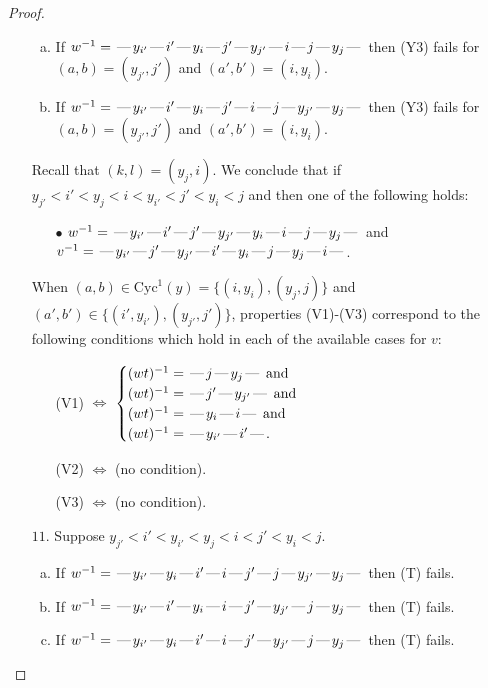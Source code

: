 \documentclass[10pt]{article}
\theoremstyle{definition}
\theoremstyle{definition}
\def\dash{\text{\hspace{0.5mm}---\hspace{0.5mm}}}
\def\Cyc{\mathrm{Cyc}}
\begin{document}
\begin{proof}
\begin{enumerate}
\begin{enumerate}[(a)]
\item If $w^{-1} = \dash y_{i'}\dash i'\dash y_i\dash j'\dash y_{j'}\dash i\dash j\dash y_j\dash $ then (Y3) fails for $(a,b)=(y_{j'},j')$ and $(a',b')=(i,y_i)$.
\item If $w^{-1} = \dash y_{i'}\dash i'\dash y_i\dash j'\dash i\dash j\dash y_{j'}\dash y_j\dash $ then (Y3) fails for $(a,b)=(y_{j'},j')$ and $(a',b')=(i,y_i)$.
\end{enumerate}
Recall that $(k,l) = (y_j,i)$.
We conclude that if $y_{j'} < i' < y_j < i < y_{i'} < j' < y_i < j$ and then one of the following holds:
\begin{enumerate}
\item[$\bullet$] $w^{-1} = \dash y_{i'}\dash i'\dash j'\dash y_{j'}\dash y_i\dash i\dash j\dash y_j\dash $ and $v^{-1} = \dash y_{i'}\dash j'\dash y_{j'}\dash i'\dash y_i\dash j\dash y_j\dash i\dash $.
\end{enumerate}
When $(a,b)\in\Cyc^1(y)=\{(i,y_i),(y_j,j)\}$ and $(a',b')\in\{(i',y_{i'}),(y_{j'},j')\}$,
properties (V1)-(V3) correspond to the following conditions which hold in
each of the available cases for $v$:
\begin{enumerate}
\item[](V1) $\Leftrightarrow$ $\begin{cases}\text{$(wt)^{-1} = \dash j \dash y_j \dash$}\text{ and }\\
\text{$(wt)^{-1} = \dash j' \dash y_{j'} \dash$}\text{ and }\\
\text{$(wt)^{-1} = \dash y_i \dash i \dash$}\text{ and }\\
\text{$(wt)^{-1} = \dash y_{i'} \dash i' \dash$}.\end{cases}$
\item[](V2) $\Leftrightarrow$ (no condition).
\item[](V3) $\Leftrightarrow$ (no condition).
\end{enumerate}
\item[$11$.] Suppose $y_{j'} < i' < y_{i'} < y_j < i < j' < y_i < j$.
\begin{enumerate}[(a)]
\item If $w^{-1} = \dash y_{i'}\dash y_i\dash i'\dash i\dash j'\dash j\dash y_{j'}\dash y_j\dash $ then (T) fails.
\item If $w^{-1} = \dash y_{i'}\dash i'\dash y_i\dash i\dash j'\dash y_{j'}\dash j\dash y_j\dash $ then (T) fails.
\item If $w^{-1} = \dash y_{i'}\dash y_i\dash i'\dash i\dash j'\dash y_{j'}\dash j\dash y_j\dash $ then (T) fails.

\end{enumerate}
\end{enumerate}
\end{proof}
\end{document}
